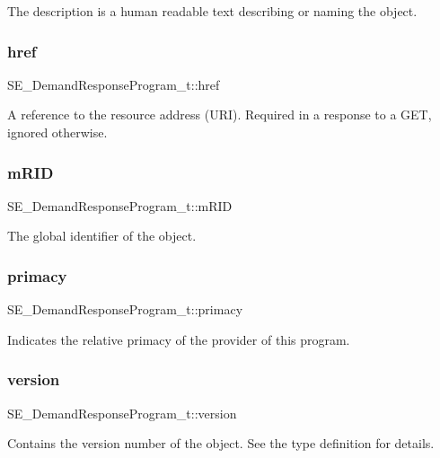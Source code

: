 The description is a human readable text describing or naming the object. \mbox{\label{group__DemandResponseProgram_gabe6a9ae9d11c40abf1de49df60c33fb2}} 
\subsubsection{\texorpdfstring{href}{href}}
{\footnotesize\ttfamily S\+E\+\_\+\+Demand\+Response\+Program\+\_\+t\+::href}

A reference to the resource address (U\+RI). Required in a response to a G\+ET, ignored otherwise. \mbox{\label{group__DemandResponseProgram_ga3a7dd308a30495cb98c203c6ae3074d1}} 
\subsubsection{\texorpdfstring{m\+R\+ID}{mRID}}
{\footnotesize\ttfamily S\+E\+\_\+\+Demand\+Response\+Program\+\_\+t\+::m\+R\+ID}

The global identifier of the object. \mbox{\label{group__DemandResponseProgram_ga40432a268b74349a00a8d08ed9710519}} 
\subsubsection{\texorpdfstring{primacy}{primacy}}
{\footnotesize\ttfamily S\+E\+\_\+\+Demand\+Response\+Program\+\_\+t\+::primacy}

Indicates the relative primacy of the provider of this program. \mbox{\label{group__DemandResponseProgram_ga1e8b20fd85c49cfe1c51cf8e23f882b5}} 
\subsubsection{\texorpdfstring{version}{version}}
{\footnotesize\ttfamily S\+E\+\_\+\+Demand\+Response\+Program\+\_\+t\+::version}

Contains the version number of the object. See the type definition for details. 